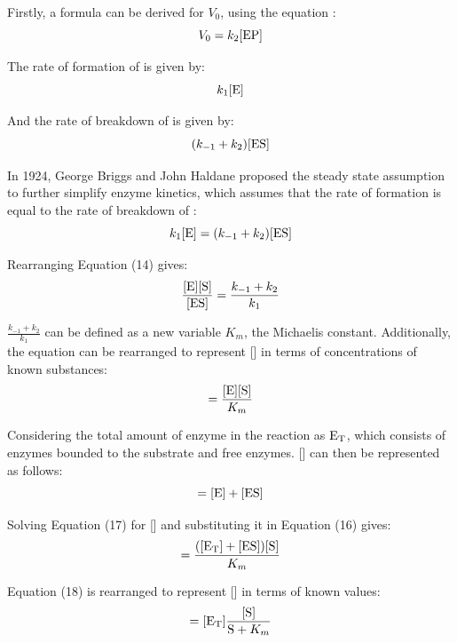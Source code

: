 \documentclass{article}
\begin{document}
\medskip

Firstly, a formula can be derived for $V_0$, using the equation :
\begin{equation}
    V_0 = k_2 [\ce{EP}]
\end{equation}

The rate of formation of  is given by:
\begin{equation}
    k_1 [\ce{E}]
\end{equation}

And the rate of breakdown of  is given by:
\begin{equation}
    (k_{-1} + k_2) [\ce{ES}]
\end{equation}

In 1924, George Briggs and John Haldane proposed the steady state assumption to further simplify enzyme kinetics, which assumes that the rate of formation is equal to the rate of breakdown of :
\begin{equation}
    k_1 [\ce{E}] = (k_{-1} + k_2) [\ce{ES}]
\end{equation}

Rearranging Equation (14) gives:
\begin{equation}
    \frac{[\ce{E}][\ce{S}]}{[\ce{ES}]} = \frac{k_{-1}+k_2}{k_1}
\end{equation}

$\frac{k_{-1}+k_2}{k_1}$ can be defined as a new variable $K_m$, the Michaelis constant. Additionally, the equation can be rearranged to represent [] in terms of concentrations of known substances:
\begin{equation}
    [\ce{ES}] = \frac{[\ce{E}][\ce{S}]}{K_m}
\end{equation}

Considering the total amount of enzyme in the reaction as $\ce{E_T}$, which consists of enzymes bounded to the substrate and free enzymes. [] can then be represented as follows:
\begin{equation}
    [\ce{E_T}] = [\ce{E}] + [\ce{ES}]
\end{equation}

Solving Equation (17) for [] and substituting it in Equation (16) gives:
\begin{equation}
    [\ce{ES}] = \frac{([\ce{E_T}] + [\ce{ES}]) [\ce{S}]}{K_m}
\end{equation}

Equation (18) is rearranged to represent [] in terms of known values:
\begin{equation}
    [\ce{ES}] = [\ce{E_T}]\frac{[\ce{S}]}{\ce{S} + K_m}
\end{equation}
\end{document}
